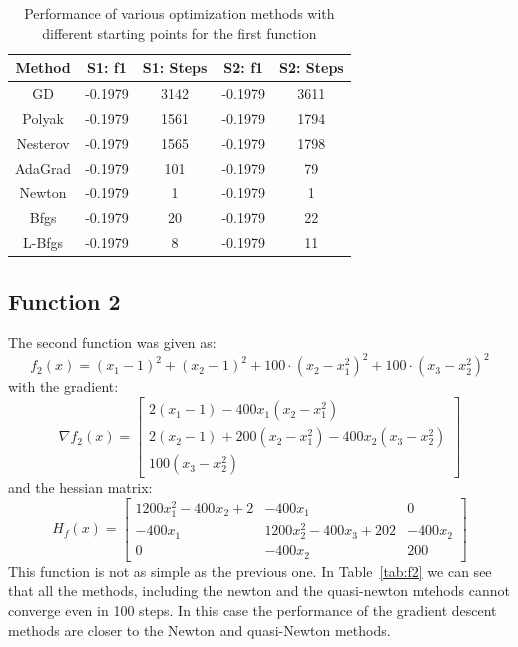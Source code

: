 \documentclass[9pt]{IEEEtran}
\begin{document}
\begin{table}[h!]
    \centering
    \begin{tabular}{|c|c|c|c|c|}
        \hline
        \textbf{Method} & \textbf{S1: f1} & \textbf{S1: Steps} & \textbf{S2: f1} & \textbf{S2: Steps} \\ \hline
        GD         & -0.1979  & 3142  & -0.1979  & 3611 \\ \hline
        Polyak     & -0.1979  & 1561  & -0.1979  & 1794 \\ \hline
        Nesterov   & -0.1979  & 1565  & -0.1979  & 1798 \\ \hline
        AdaGrad    & -0.1979  & 101   & -0.1979  & 79   \\ \hline
        Newton     & -0.1979  & 1     & -0.1979  & 1    \\ \hline
        Bfgs       & -0.1979  & 20    & -0.1979  & 22   \\ \hline
        L-Bfgs    & -0.1979  & 8     & -0.1979  & 11   \\ \hline
    \end{tabular}
    \vspace{3pt}
    \caption{Performance of various optimization methods with different starting points for the first function}
    \label{tab:f1_time}
\end{table}

\clearpage
\subsection{Function 2}
The second function was given as:
\[
f_2(x) = (x_1 - 1)^2 + (x_2 - 1)^2 + 100 \cdot (x_2 - x_1^2)^2 + 100 \cdot (x_3 - x_2^2)^2
\]
with the gradient:
\[
\nabla f_2(x) = \begin{bmatrix}
    2(x_1 - 1) - 400x_1(x_2 - x_1^2) \\
    2(x_2 - 1) + 200(x_2 - x_1^2) - 400x_2(x_3 - x_2^2) \\
    100(x_3 - x_2^2)
\end{bmatrix}
\]
and the hessian matrix:
\[
H_f(x) = \begin{bmatrix}
    1200x_1^2 - 400x_2 + 2 & -400x_1 & 0 \\
    -400x_1 & 1200x_2^2 - 400x_3 + 202 & -400x_2 \\
    0 & -400x_2 & 200
\end{bmatrix}
\]
This function is not as simple as the previous one. In Table~\ref{tab:f2} we can see that all the methods, including 
the newton and the quasi-newton mtehods cannot converge even in 100 steps. In this case the performance of the 
 gradient descent methods are closer to the Newton and quasi-Newton methods.  
\end{document}
